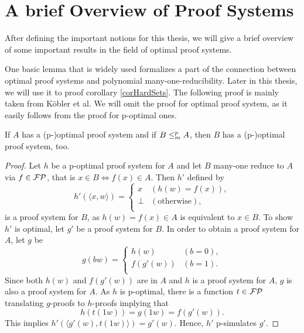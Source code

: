 \chapter{A brief Overview of Proof Systems} \label{chpOverview}
  After defining the important notions for this thesis, we will give a brief overview of some important results in the field of optimal proof systems.

  One basic lemma that is widely used formalizes a part of the connection between optimal proof systems and polynomial many-one-reducibility. Later in this thesis, we will use it to proof corollary \ref{corHardSets}. The following proof is mainly taken from Köbler et al. We will omit the proof for optimal proof system, as it easily follows from the proof for p-optimal ones.

  \begin{lemma} \label{lemManyOneProofSystem}
    If \(A\) has a (p-)optimal proof system and if \(B \leq_{m}^{p} A\), then \(B\) has a (p-)optimal proof system, too.
  \end{lemma}

  \begin{proof}
    Let \(h\) be a p-optimal proof system for \(A\) and let \(B\) many-one reduce to \(A\) via \(f \in \mathcal{FP}\), that is \(x \in B \Leftrightarrow f(x) \in A\). Then \(h'\) defined by
      \[
        h'(\langle x, w \rangle) =
        \begin{cases}
          x & (h(w) = f(x)), \\
          \perp & (\text{otherwise}), \\
        \end{cases}
      \]
    is a proof system for \(B\), as \(h(w) = f(x) \in A\) is equivalent to \(x \in B\). To show \(h'\) is optimal, let \(g'\) be a proof system for \(B\). In order to obtain a proof system for \(A\), let \(g\) be
      \[
        g(bw) =
        \begin{cases}
          h(w) & (b = 0), \\
          f(g'(w)) & (b = 1). \\
        \end{cases}
      \]
    Since both \(h(w)\) and \(f(g'(w))\) are in \(A\) and \(h\) is a proof system for \(A\), \(g\) is also a proof system for \(A\). As \(h\) is p-optimal, there is a function \(t \in \mathcal{FP}\) translating \(g\)-proofs to \(h\)-proofs implying that
    \[
      h(t(1w)) = g(1w) = f(g'(w)).
    \]
    This implies \(h'(\langle g'(w), t(1w) \rangle ) = g'(w)\). Hence, \(h'\) p-simulates \(g'\).
  \end{proof}

